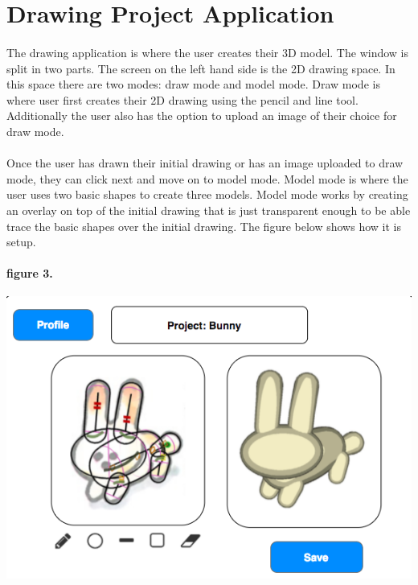 \documentclass{report}
\begin{document}
\section{Drawing Project Application}

\paragraph{} The drawing application is where the user creates their 3D model. The window is split in two parts. The screen on the left hand side is the 2D drawing space. In this space there are two modes: draw mode and model mode. Draw mode is where user first creates their 2D drawing using the pencil and line tool. Additionally the user also has the option to upload an image of their choice for draw mode. {}

\paragraph{} Once the user has drawn their initial drawing or has an image uploaded to draw mode, they can click next and move on to model mode. Model mode is where the user uses two basic shapes to create three models. Model mode works by creating an overlay on top of the initial drawing that is just transparent enough to be able trace the basic shapes over the initial drawing. The figure below shows how it is setup.
\paragraph{figure 3.}
\begin{center}
\includegraphics[width=\textwidth/2]{draw_page.png}
\end{center}
\end{document}
